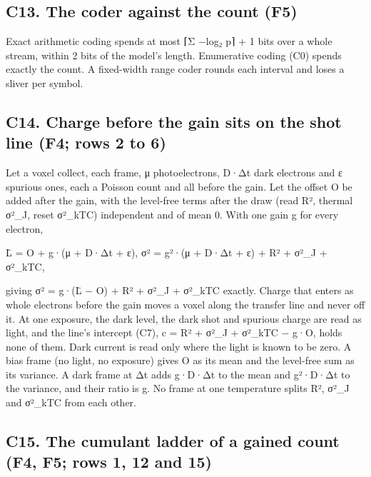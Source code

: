 \subsection{\texorpdfstring{C13. The coder against the count (F5)}{C13. The coder against the count (F5)}}

Exact arithmetic coding spends at most ⌈Σ −log₂ p⌉ + 1 bits over a whole stream, within 2 bits of the model's length. Enumerative coding (C0) spends exactly the count. A fixed-width range coder rounds each interval and loses a sliver per symbol.

\subsection{\texorpdfstring{C14. Charge before the gain sits on the shot line (F4; rows 2 to 6)}{C14. Charge before the gain sits on the shot line (F4; rows 2 to 6)}}

Let a voxel collect, each frame, μ photoelectrons, D·Δt dark electrons and ε spurious ones, each a Poisson count and all before the gain. Let the offset O be added after the gain, with the level-free terms after the draw (read R², thermal σ²\_\allowbreak{}J, reset σ²\_\allowbreak{}kTC) independent and of mean 0. With one gain g for every electron,

L̄ = O + g·(μ + D·Δt + ε),  σ² = g²·(μ + D·Δt + ε) + R² + σ²\_\allowbreak{}J + σ²\_\allowbreak{}kTC,

giving σ² = g·(L̄ − O) + R² + σ²\_\allowbreak{}J + σ²\_\allowbreak{}kTC exactly. Charge that enters as whole electrons before the gain moves a voxel along the transfer line and never off it. At one exposure, the dark level, the dark shot and spurious charge are read as light, and the line's intercept (C7), c = R² + σ²\_\allowbreak{}J + σ²\_\allowbreak{}kTC − g·O, holds none of them. Dark current is read only where the light is known to be zero. A bias frame (no light, no exposure) gives O as its mean and the level-free sum as its variance. A dark frame at Δt adds g·D·Δt to the mean and g²·D·Δt to the variance, and their ratio is g. No frame at one temperature splits R², σ²\_\allowbreak{}J and σ²\_\allowbreak{}kTC from each other.

\subsection{\texorpdfstring{C15. The cumulant ladder of a gained count (F4, F5; rows 1, 12 and 15)}{C15. The cumulant ladder of a gained count (F4, F5; rows 1, 12 and 15)}}

